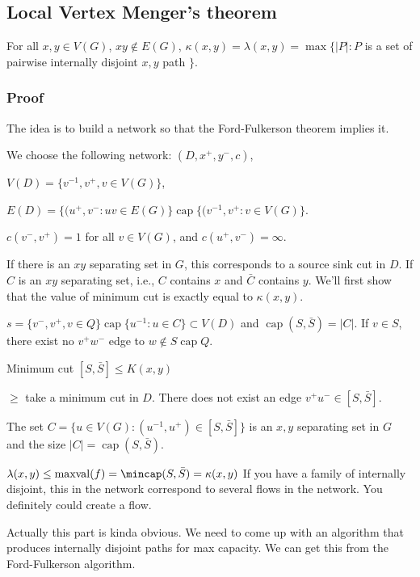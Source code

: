 \documentclass[11pt]{article}
\def\max{\operatorname{max}}
\begin{document}
{\subsection{Local Vertex Menger's theorem}
\label{sec:org1d072f2}
For all \(x, y \in V(G)\), \(xy\notin E(G)\), \(\kappa(x, y) = \lambda(x, y) =
   \max\{\vert P \vert \colon P\) is a set of pairwise internally disjoint \(x, y\)
path \(\}\).
\subsubsection{Proof}
\label{sec:org8df2dc0}
The idea is to build a network so that the Ford-Fulkerson theorem implies
it.

We choose the following network: \((D, x^{+}, y^{-}, c)\),

\(V(D) = \{v^{-1}, v^{+}, v\in V(G)\}\),

\(E(D) =\{(u^{+}, v^{-} \colon uv \in E(G)\} \operatorname{cap} \{(v^{-1}, v^{+} \colon v
    \in V(G)\}\).

\(c(v^{-}, v^{+}) = 1\) for all \(v \in V(G)\), and \(c(u^{+}, v^{-}) = \infty\).

If there is an \(xy\) separating set in \(G\), this corresponds to a source sink
cut in \(D\). If \(C\) is an \(xy\) separating set, i.e., \(C\) contains \(x\) and
\(\bar{C}\) contains \(y\). We'll first show that the value of minimum cut is
exactly equal to \(\kappa(x, y)\).

\(s = \{v^-, v^{+}, v\in Q\} \operatorname{cap} \{u^{-1}\colon u \in C\} \subset V(D)\) and
\(\operatorname{cap} (S, \bar{S}) = \vert C \vert\). If \(v \in S\), there exist no
\(v^{+}w^{-}\) edge to \(w \notin S \operatorname{cap} Q\).

Minimum cut \([S, \bar{S}] \le K(x, y)\)

\(\ge\) take a minimum cut in \(D\). There does not exist an edge \(v^{+}u^{-}
    \in [S, \bar{S}]\).

The set \(C = \{u \in V(G) \colon (u^{-1}, u^{+}) \in [S, \bar{S}]\}\) is an
\(x, y\) separating set in \(G\) and the size \(\vert C \vert = \operatorname{cap}(S,
    \bar{S})\).

\(\lambda(x, y) \le \operatorname{maxval}(f) = \mincap(S, \bar{S}) =
    \kappa(x, y)\) If you have a family of internally disjoint, this in the
network correspond to several flows in the network. You definitely could
create a flow.

Actually this part is kinda obvious. We need to come up with an algorithm
that produces internally disjoint paths for max capacity. We can get this
from the Ford-Fulkerson algorithm.
}
\end{document}
